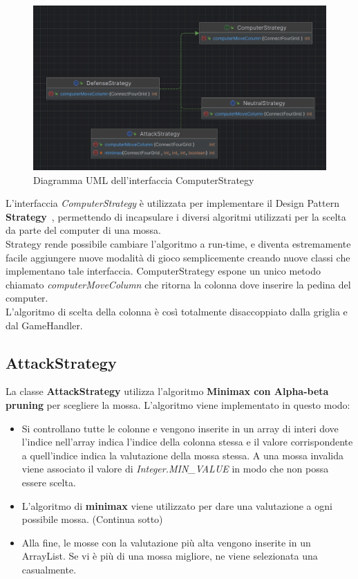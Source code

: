 \begin{figure}
    \centering
    \includegraphics[scale=0.4]{img/strategy-uml}
    \caption{Diagramma UML dell'interfaccia ComputerStrategy}
    \label{fig:strategy-uml}
\end{figure}

L'interfaccia \textit{ComputerStrategy} è utilizzata per implementare il Design Pattern \textbf{Strategy}~\cite{GoF},
permettendo di incapsulare i diversi algoritmi utilizzati per la scelta da parte del computer di una mossa. \\
Strategy rende possibile cambiare l'algoritmo a run-time, e diventa estremamente facile aggiungere nuove modalità
di gioco semplicemente creando nuove classi che implementano tale interfaccia.
ComputerStrategy espone un unico metodo chiamato \textit{computerMoveColumn} che ritorna la colonna dove inserire
la pedina del computer. \\
L'algoritmo di scelta della colonna è così totalmente disaccoppiato dalla griglia e dal GameHandler. \\

\subsection{AttackStrategy}\label{subsec:attackstrategy}

La classe \textbf{AttackStrategy} utilizza l'algoritmo \textbf{Minimax con Alpha-beta pruning}\cite{Wiki} per scegliere la mossa.
L'algoritmo viene implementato in questo modo: \\
\begin{itemize}
    \item Si controllano tutte le colonne e vengono inserite in un array di interi dove l'indice nell'array indica
    l'indice della colonna stessa e il valore corrispondente a quell'indice indica la valutazione della mossa stessa.
    A una mossa invalida viene associato il valore di \textit{Integer.MIN\_VALUE} in modo che non possa essere scelta.
    \item L'algoritmo di \textbf{minimax} viene utilizzato per dare una valutazione a ogni possibile mossa.
    (Continua sotto)
    \item Alla fine, le mosse con la valutazione più alta vengono inserite in un ArrayList.
    Se vi è più di una mossa migliore, ne viene selezionata una casualmente.
\end{itemize}


